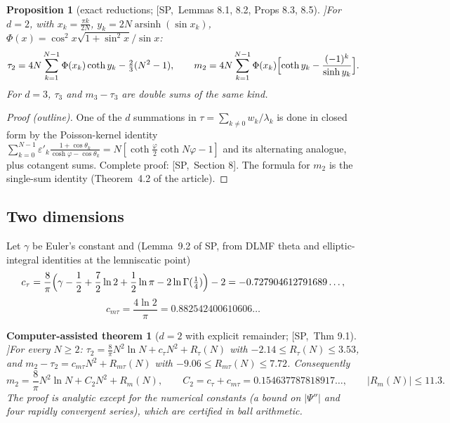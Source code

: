 \documentclass[10pt,a4paper]{article}
\theoremstyle{plain}
\newtheorem{catheorem}[theorem]{Computer-assisted theorem}
\newtheorem{proposition}[theorem]{Proposition}
\theoremstyle{definition}
\newcommand{\src}[2]{[\textsf{#1},~#2]}           %
\newcommand{\SPE}{\textsf{SP}}
\newcommand{\arsinh}{\operatorname{arsinh}}
\begin{document}
\begin{proposition}[exact reductions; \src{\SPE}{Lemmas 8.1, 8.2, Props 8.3, 8.5}]\label{prop:singlesum}
For $d=2$, with $x_k=\frac{\pi k}{2N}$, $y_k=2N\arsinh(\sin x_k)$, $\Phi(x)=\cos^2x\sqrt{1+\sin^2x}/\sin x$:
\[
\tau_2=4N\sum_{k=1}^{N-1}\Phi(x_k)\coth y_k-\tfrac23(N^2-1),\qquad m_2=4N\sum_{k=1}^{N-1}\Phi(x_k)\Bigl[\coth y_k-\frac{(-1)^k}{\sinh y_k}\Bigr].
\]
For $d=3$, $\tau_3$ and $m_3-\tau_3$ are double sums of the same kind.
\end{proposition}
\begin{proof}[Proof (outline)]
One of the $d$ summations in $\tau=\sum_{k\ne0}w_k/\lambda_k$ is done in closed form by the Poisson-kernel identity $\sum_{k=0}^{N-1}\varepsilon'_k\frac{1+\cos\theta_k}{\cosh\varphi-\cos\theta_k}=N[\coth\frac\varphi2\coth N\varphi-1]$ and its alternating analogue, plus cotangent sums. Complete proof: \src{\SPE}{Section 8}. The formula for $m_2$ is the single-sum identity (Theorem~4.2 of the article).
\end{proof}

\subsection{Two dimensions}

Let $\gamma$ be Euler's constant and (Lemma~9.2 of \SPE, from DLMF theta and elliptic-integral identities at the lemniscatic point)
\[
c_\tau=\frac8\pi\Bigl(\gamma-\frac12+\frac72\ln2+\frac12\ln\pi-2\ln\Gamma(\tfrac14)\Bigr)-2=-0.727904612791689\ldots,
\]
\[
c_{m\tau}=\frac{4\ln2}\pi=0.882542400610606\ldots
\]

\begin{catheorem}[$d=2$ with explicit remainder; \src{\SPE}{Thm 9.1}]\label{thm:d2}
For every $N\ge2$: $\tau_2=\frac8\pi N^2\ln N+c_\tau N^2+R_\tau(N)$ with $-2.14\le R_\tau(N)\le3.53$, and $m_2-\tau_2=c_{m\tau}N^2+R_{m\tau}(N)$ with $-9.06\le R_{m\tau}(N)\le7.72$. Consequently
\[
m_2=\frac8\pi N^2\ln N+C_2N^2+R_m(N),\qquad C_2=c_\tau+c_{m\tau}=0.154637787818917\ldots,\qquad |R_m(N)|\le11.3 .
\]
The proof is analytic except for the numerical constants (a bound on $|\Psi''|$ and four rapidly convergent series), which are certified in ball arithmetic.
\end{catheorem}
\end{document}
